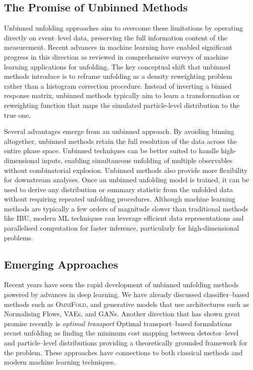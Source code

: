     \subsection{The Promise of Unbinned Methods}
        Unbinned unfolding approaches aim to overcome these limitations by operating directly on event--level data, preserving the full information content of the measurement.
        Recent advances in machine learning have enabled significant progress in this direction as reviewed in comprehensive surveys of machine learning applications for unfolding.
        The key conceptual shift that unbinned methods introduce is to reframe unfolding as a density reweighting problem rather than a histogram correction procedure.
        Instead of inverting a binned response matrix, unbinned methods typically aim to learn a transformation or reweighting function that maps the simulated particle-level distribution to the true one.

        Several advantages emerge from an unbinned approach.
        By avoiding binning altogether, unbinned methods retain the full resolution of the data across the entire phase space.
        Unbinned techniques can be better suited to handle high-dimensional inputs, enabling simultaneous unfolding of multiple observables without combinatorial explosion.
        Unbinned methods also provide more flexibility for downstream analyses.
        Once an unbinned unfolding model is trained, it can be used to derive any distribution or summary statistic from the unfolded data without requiring repeated unfolding procedures.
        Although machine learning methods are typically a few orders of magnitude slower than traditional methods like IBU, modern ML techniques can leverage efficient data representations and parallelised computation for faster inference, particularly for high-dimensional problems.
    \subsection{Emerging Approaches}
        Recent years have seen the rapid development of unbinned unfolding methods powered by advances in deep learning.
        We have already discussed classifier--based methods such as \textsc{OmniFold}, and generative models that use architectures such as Normalising Flows, VAEs, and GANs.
        Another direction that has shown great promise recently is \emph{optimal transport}
        Optimal transport--based formulations recast unfolding as finding the minimum cost mapping between detector--level and particle--level distributions providing a theoretically grounded framework for the problem.
        These approaches have connections to both classical methods and modern machine learning techniques.

